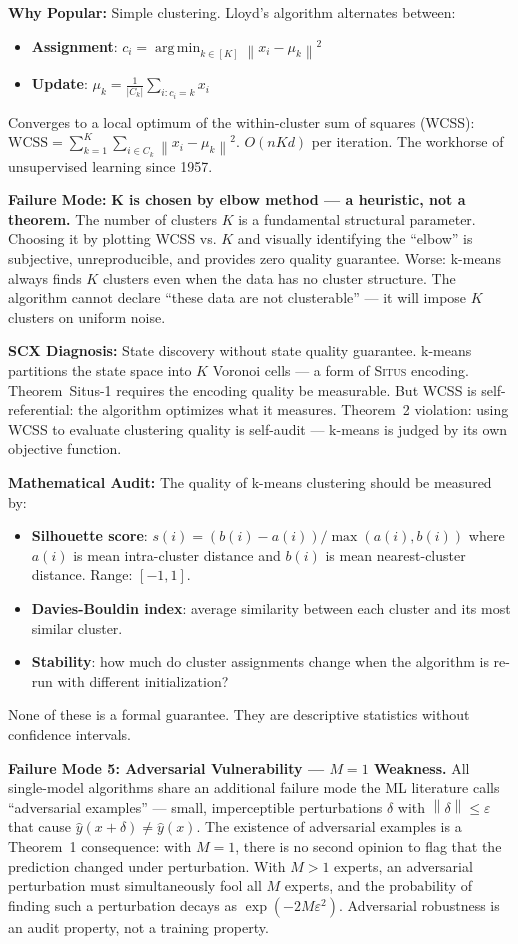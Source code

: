 \documentclass[12pt,a4paper]{article}
\theoremstyle{definition}
\newcommand{\Situs}{\textsc{Situs}}
\DeclareMathOperator*{\argmin}{arg\,min}
\newcommand{\norm}[1]{\left\lVert#1\right\rVert}
\newcommand{\whyPopular}{\noindent\textbf{Why Popular:} }
\newcommand{\whyFail}{\noindent\textbf{Failure Mode:} }
\newcommand{\diagnosis}{\noindent\textbf{SCX Diagnosis:} }
\newcommand{\mathAudit}{\noindent\textbf{Mathematical Audit:} }
\begin{document}
\whyPopular{} Simple clustering. Lloyd's algorithm alternates between:
\begin{itemize}[nosep]
    \item \textbf{Assignment}: $c_i = \argmin_{k \in [K]} \norm{x_i - \mu_k}^2$
    \item \textbf{Update}: $\mu_k = \frac{1}{|C_k|}\sum_{i: c_i=k} x_i$
\end{itemize}
Converges to a local optimum of the within-cluster sum of squares (WCSS): $\text{WCSS} = \sum_{k=1}^K \sum_{i \in C_k} \norm{x_i - \mu_k}^2$. $O(nKd)$ per iteration. The workhorse of unsupervised learning since 1957.

\whyFail{} \textbf{K is chosen by elbow method — a heuristic, not a theorem.} The number of clusters $K$ is a fundamental structural parameter. Choosing it by plotting WCSS vs. $K$ and visually identifying the ``elbow'' is subjective, unreproducible, and provides zero quality guarantee. Worse: k-means always finds $K$ clusters even when the data has no cluster structure. The algorithm cannot declare ``these data are not clusterable'' — it will impose $K$ clusters on uniform noise.

\diagnosis{} State discovery without state quality guarantee. k-means partitions the state space into $K$ Voronoi cells — a form of \Situs{} encoding. Theorem~Situs-1 requires the encoding quality be measurable. But WCSS is self-referential: the algorithm optimizes what it measures. Theorem~2 violation: using WCSS to evaluate clustering quality is self-audit — k-means is judged by its own objective function.

\mathAudit{} The quality of k-means clustering should be measured by:
\begin{itemize}[nosep]
    \item \textbf{Silhouette score}: $s(i) = (b(i) - a(i)) / \max(a(i), b(i))$ where $a(i)$ is mean intra-cluster distance and $b(i)$ is mean nearest-cluster distance. Range: $[-1, 1]$.
    \item \textbf{Davies-Bouldin index}: average similarity between each cluster and its most similar cluster.
    \item \textbf{Stability}: how much do cluster assignments change when the algorithm is re-run with different initialization?
\end{itemize}
None of these is a formal guarantee. They are descriptive statistics without confidence intervals.

\noindent\textbf{Failure Mode 5: Adversarial Vulnerability — $M=1$ Weakness.} All single-model algorithms share an additional failure mode the ML literature calls ``adversarial examples'' — small, imperceptible perturbations $\delta$ with $\norm{\delta} \le \varepsilon$ that cause $\hat{y}(x+\delta) \neq \hat{y}(x)$. The existence of adversarial examples is a Theorem~1 consequence: with $M=1$, there is no second opinion to flag that the prediction changed under perturbation. With $M>1$ experts, an adversarial perturbation must simultaneously fool all $M$ experts, and the probability of finding such a perturbation decays as $\exp(-2M\varepsilon^2)$. Adversarial robustness is an audit property, not a training property.
\end{document}
